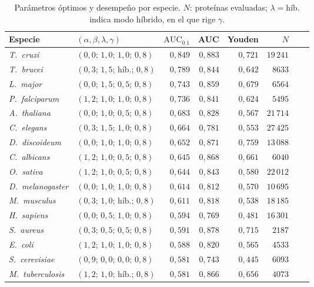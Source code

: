 \documentclass[11pt,a4paper]{article}
\newcommand{\AUCcero}{\text{AUC}_{0.1}}
\newcommand{\spn}[1]{\textit{#1}}
\begin{document}
\begin{table}[H]
\centering
\caption{Parámetros óptimos y desempeño por especie. $N$: proteínas evaluadas;
$\lambda = \text{híb.}$ indica modo híbrido, en el que rige $\gamma$.}
\label{tab:optimos}
\small
\begin{tabular}{llrrrrrr}
\toprule
Especie & $(\alpha,\beta,\lambda,\gamma)$ & $\AUCcero$ & AUC & Youden & $N$ \\
\midrule
\spn{T.~cruzi}          & $(0{,}0;\,1{,}0;\,1{,}0;\,0{,}8)$      & $0{,}849$ & $0{,}883$ & $0{,}721$ & $19\,241$ \\
\spn{T.~brucei}         & $(0{,}3;\,1{,}5;\,\text{híb.};\,0{,}8)$ & $0{,}789$ & $0{,}844$ & $0{,}642$ & $8633$ \\
\spn{L.~major}          & $(0{,}0;\,1{,}5;\,0{,}5;\,0{,}8)$      & $0{,}743$ & $0{,}859$ & $0{,}679$ & $6564$ \\
\spn{P.~falciparum}     & $(1{,}2;\,1{,}0;\,1{,}0;\,0{,}8)$      & $0{,}736$ & $0{,}841$ & $0{,}624$ & $5495$ \\
\spn{A.~thaliana}       & $(0{,}0;\,1{,}0;\,0{,}5;\,0{,}8)$      & $0{,}683$ & $0{,}828$ & $0{,}567$ & $21\,714$ \\
\spn{C.~elegans}        & $(0{,}3;\,1{,}5;\,1{,}0;\,0{,}8)$      & $0{,}664$ & $0{,}781$ & $0{,}553$ & $27\,425$ \\
\spn{D.~discoideum}     & $(0{,}0;\,1{,}0;\,1{,}0;\,0{,}8)$      & $0{,}652$ & $0{,}871$ & $0{,}759$ & $13\,088$ \\
\spn{C.~albicans}       & $(1{,}2;\,1{,}0;\,0{,}5;\,0{,}8)$      & $0{,}645$ & $0{,}868$ & $0{,}661$ & $6040$ \\
\spn{O.~sativa}         & $(1{,}2;\,1{,}0;\,0{,}5;\,0{,}8)$      & $0{,}644$ & $0{,}843$ & $0{,}580$ & $22\,012$ \\
\spn{D.~melanogaster}   & $(0{,}0;\,1{,}0;\,1{,}0;\,0{,}8)$      & $0{,}614$ & $0{,}812$ & $0{,}570$ & $10\,695$ \\
\spn{M.~musculus}       & $(0{,}3;\,1{,}0;\,\text{híb.};\,0{,}8)$ & $0{,}611$ & $0{,}818$ & $0{,}538$ & $18\,185$ \\
\spn{H.~sapiens}        & $(0{,}0;\,0{,}5;\,1{,}0;\,0{,}8)$      & $0{,}594$ & $0{,}769$ & $0{,}481$ & $16\,301$ \\
\spn{S.~aureus}         & $(0{,}3;\,0{,}5;\,0{,}5;\,0{,}8)$      & $0{,}591$ & $0{,}878$ & $0{,}715$ & $2187$ \\
\spn{E.~coli}           & $(1{,}2;\,1{,}0;\,1{,}0;\,0{,}8)$      & $0{,}588$ & $0{,}820$ & $0{,}565$ & $4533$ \\
\spn{S.~cerevisiae}     & $(0{,}9;\,0{,}0;\,0{,}0;\,0{,}8)$      & $0{,}581$ & $0{,}743$ & $0{,}445$ & $6093$ \\
\spn{M.~tuberculosis}   & $(1{,}2;\,1{,}0;\,\text{híb.};\,0{,}8)$ & $0{,}581$ & $0{,}866$ & $0{,}656$ & $4073$ \\
\bottomrule
\end{tabular}
\end{table}
\end{document}
